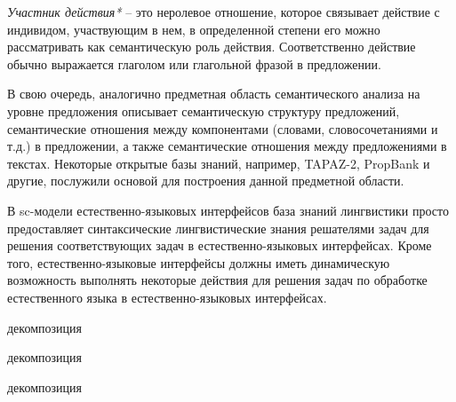 \textit{Участник действия*} -- это неролевое отношение, которое связывает действие с индивидом, участвующим в нем, в определенной степени его можно рассматривать как семантическую роль действия. Соответственно действие обычно выражается глаголом или глагольной фразой в предложении.

В свою очередь, аналогично предметная область семантического анализа на уровне предложения описывает семантическую структуру предложений, семантические отношения между компонентами (словами, словосочетаниями и т.д.) в предложении, а также семантические отношения между предложениями в текстах. Некоторые открытые базы знаний, например, TAPAZ-2, PropBank и другие, послужили основой для построения данной предметной области.

В sc-модели естественно-языковых интерфейсов база знаний лингвистики просто предоставляет синтаксические лингвистические знания решателями задач для решения соответствующих задач в естественно-языковых интерфейсах. Кроме того, естественно-языковые интерфейсы должны иметь динамическую возможность выполнять некоторые действия для решения задач по обработке естественного языка в естественно-языковых интерфейсах. 
\begin{SCn}
	\begin{scnrelfromset}{декомпозиция}
	\end{scnrelfromset}
\end{SCn}

\begin{SCn}
	\begin{scnrelfromset}{декомпозиция}
	\end{scnrelfromset}
\end{SCn}

\begin{SCn}
	\begin{scnrelfromset}{декомпозиция}
	\end{scnrelfromset}
\end{SCn}

